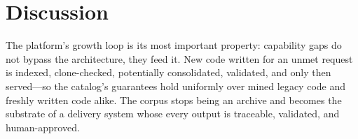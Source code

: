\documentclass[conference]{IEEEtran}
\begin{document}
\section{Discussion}
The platform's growth loop is its most important property: capability gaps do not bypass the architecture, they feed it. New code written for an unmet request is indexed, clone-checked, potentially consolidated, validated, and only then served---so the catalog's guarantees hold uniformly over mined legacy code and freshly written code alike. The corpus stops being an archive and becomes the substrate of a delivery system whose every output is traceable, validated, and human-approved.
\end{document}
